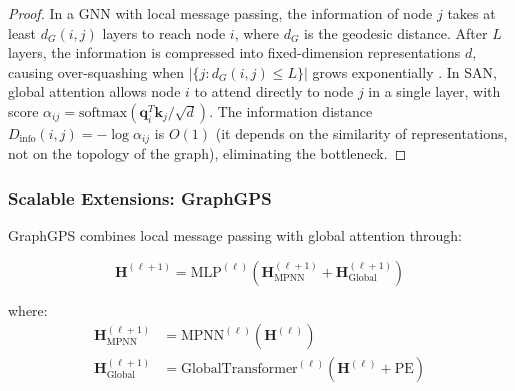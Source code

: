 \begin{proof}
In a \gls{GNN} with local message passing, the information of node $j$ takes at least $d_G(i,j)$ layers to reach node $i$, where $d_G$ is the geodesic distance. After $L$ layers, the information is compressed into fixed-dimension representations $d$, causing over-squashing when $|\{j: d_G(i,j) \leq L\}|$ grows exponentially \citep{topping2022understanding}. In SAN, global attention allows node $i$ to attend directly to node $j$ in a single layer, with score $\alpha_{ij} = \text{softmax}(\mathbf{q}_i^T \mathbf{k}_j / \sqrt{d})$. The information distance $D_{\text{info}}(i,j) = -\log \alpha_{ij}$ is $O(1)$ (it depends on the similarity of representations, not on the topology of the graph), eliminating the bottleneck.
\end{proof}

\subsubsection{Scalable Extensions: GraphGPS}\label{subsubsec:graphgps}

\begin{definition}\label{def:graphgps_architecture}
GraphGPS \citep{rampasek2022graphgps} combines local message passing with global attention through:

\begin{equation}
    \mathbf{H}^{(\ell+1)} = \text{MLP}^{(\ell)}\left(\mathbf{H}_{\text{MPNN}}^{(\ell+1)} + \mathbf{H}_{\text{Global}}^{(\ell+1)}\right)
    \label{eq:graphgps_architecture}
\end{equation}

where:
\begin{align}
    \mathbf{H}_{\text{MPNN}}^{(\ell+1)} &= \text{MPNN}^{(\ell)}(\mathbf{H}^{(\ell)}) \\
    \mathbf{H}_{\text{Global}}^{(\ell+1)} &= \text{GlobalTransformer}^{(\ell)}(\mathbf{H}^{(\ell)} + \text{PE})
    \label{eq:graphgps_components}
\end{align}
\end{definition}


